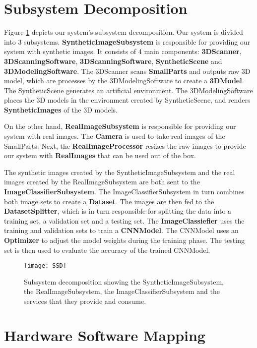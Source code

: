 \section{Subsystem Decomposition}\label{sec:subsystem_decomposition}

Figure \ref{fig:SSD} depicts our system's subsystem decomposition. Our system is divided into 3 subsystems. \textbf{SyntheticImageSubsystem} is responsible for providing our system with synthetic images. It consists of 4 main components: \textbf{3DScanner}, \textbf{3DScanningSoftware}, \textbf{3DScanningSoftware}, \textbf{SyntheticScene} and \textbf{3DModelingSoftware}. The 3DScanner scans \textbf{SmallParts} and outputs raw 3D model, which are processes by the 3DModelingSoftware to create a \textbf{3DModel}. The SyntheticScene generates an artificial environment. The 3DModelingSoftware places the 3D models in the environment created by SyntheticScene, and renders \textbf{SyntheticImages} of the 3D models.

On the other hand, \textbf{RealImageSubsystem} is responsible for providing our system with real images. The \textbf{Camera} is used to take real images of the SmallParts. Next, the \textbf{RealImageProcessor} resizes the raw images to provide our system with \textbf{RealImages} that can be used out of the box.

The synthetic images created by the SyntheticImageSubsystem and the real images created by the RealImageSubsystem are both sent to the \textbf{ImageClassifierSubsystem}. The ImageClassifierSubsystem in turn combines both image sets to create a \textbf{Dataset}. The images are then fed to the \textbf{DatasetSplitter}, which is in turn responsible for splitting the data into a training set, a validation set and a testing set. The \textbf{ImageClassiefier} uses the training and validation sets to train a \textbf{CNNModel}. The CNNModel uses an \textbf{Optimizer} to adjust the model weights during the training phase. The testing set is then used to evaluate the accuracy of the trained CNNModel.

\begin{figure}[H]
\centering
  \texttt{[image: SSD]}
\caption{Subsystem decomposition showing the SyntheticImageSubsystem, the RealImageSubsystem, the ImageClassifierSubsystem and the services that they provide and consume.}
\label{fig:SSD}
\end{figure}


\section{Hardware Software Mapping}\label{sec:hardware_software_mapping}


